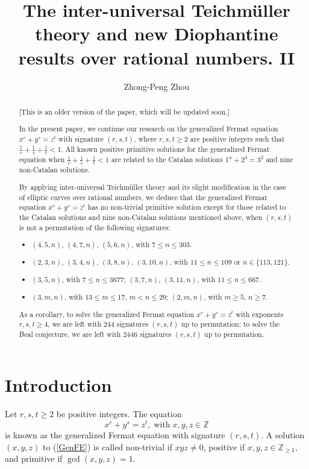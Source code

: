 \documentclass[a4paper, 12pt]{article}
\title{The inter-universal Teichm\"uller theory and new Diophantine results over rational numbers. II}
\author{Zhong-Peng Zhou}
\date{}
\numberwithin{equation}{section}
\theoremstyle{definition}
\begin{document}
\maketitle

\begin{abstract}
[This is an older version of the paper, which will be updated soon.] 

In the present paper, we continue our research on the generalized Fermat equation $x^r + y^s = z^t$ with signature $(r, s, t)$, where $r, s, t \ge 2$ are positive integers such that $\frac{1}{r} + \frac{1}{s} + \frac{1}{t} < 1$.  
All known positive primitive solutions for the generalized Fermat equation when $\frac{1}{r} + \frac{1}{s} + \frac{1}{t} < 1$ are related to the Catalan solutions $1^n + 2^3 = 3^2$ and nine non-Catalan solutions.

By applying inter-universal Teichmüller theory and its slight modification in the case of elliptic curves over rational numbers, we deduce that the generalized Fermat equation $x^r + y^s = z^t$ has no non-trivial primitive solution except for those related to the Catalan solutions and nine non-Catalan solutions mentioned above, when $(r, s, t)$ is not a permutation of the following signatures:
\begin{itemize}
\item $(4,5,n)$, $(4,7,n)$, $(5,6,n)$, with $7 \le n \le 303$.
\item $(2,3,n)$, $(3,4,n)$, $(3,8,n)$, $(3,10,n)$, with $11\le n \le 109$ or $n\in \{113, 121\}$.
\item $(3,5,n)$, with $7\le n \le 3677$; $(3,7,n)$, $(3,11,n)$, with $11 \le n \le 667$.
\item $(3,m,n)$, with $13 \le m \le 17$, $m < n \le 29$; $(2,m,n)$, with $m \ge 5$, $n\ge 7$.
\end{itemize}

As a corollary, to solve the generalized Fermat equation $x^r + y^s = z^t$ with exponents $r,s,t \ge 4$, we are left with $244$ signatures $(r,s,t)$ up to permutation;
to solve the Beal conjecture, we are left with $2446$ signatures $(r,s,t)$ up to permutation.

\end{abstract}

\makeatletter
{}
\makeatother

\section*{Introduction}
Let $ r, s, t \ge 2 $ be positive integers. The equation
\begin{equation} \label{GenFE} \tag{$\star$}
x^r + y^s = z^t, \;\text{with}\; x, y, z \in \mathbb{Z}
\end{equation}
is known as the generalized Fermat equation with signature $(r, s, t)$.
A solution $(x, y, z)$ to (\ref{GenFE}) is called non-trivial if $xyz \neq 0$, positive if $x, y, z \in \mathbb{Z}_{\ge 1}$, and primitive if $\gcd(x, y, z) = 1$.
\end{document}
